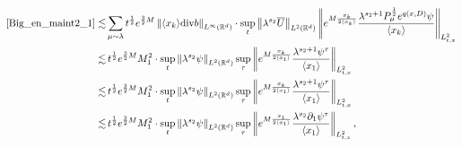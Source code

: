 \documentclass[10pt,twoside,a4paper]{article}
\numberwithin{equation}{section}\allowdisplaybreaks
\begin{document}
\begin{align*}
	\eqref{Big_en_maint2_1}\lesssim &  \sum_{\mu\sim \lambda}  t^{\frac12} e^{\frac 32M}\left\|\langle x_k\rangle \mathrm{div}b  \right\|_{L^{\infty}(\mathbb{R}^d)} \cdot \sup_{t }\left\| \lambda^{s_2}\overline{U}\right\|_{L^{2}(\mathbb{R}^d)}   \left\|e^{M \frac{x_k}{2\langle x_k\rangle} }  \frac{\lambda^{s_2+1}P_\mu^{\frac 12}  e^{q (x,D)} \psi}{\langle x_k\rangle }  \right\|_{L^2_{t,x}} \\
	\lesssim & \,t^{\frac12} e^{\frac 32M} M_1^2 \cdot \sup_{t }\left\| \lambda^{s_2} \psi\right\|_{L^{2}(\mathbb{R}^d)}  \sup_{\tau}   \left\| e^{M \frac{x_k}{2\langle x_1\rangle} }  \frac{\lambda^{s_2+1} \psi^{\tau }}{\langle x_1\rangle } \right\|_{L^2_{t,x}}\\
	\lesssim & \,t^{\frac12} e^{\frac 32M} M_1^2  \cdot \sup_{t }\left\| \lambda^{s_2} \psi\right\|_{L^{2}(\mathbb{R}^d)}  \sup_{\tau}   \left\| e^{M \frac{x_k}{2\langle x_1\rangle} }  \frac{\lambda^{s_2+1} \psi^{\tau }}{\langle x_1\rangle } \right\|_{L^2_{t,x}} \\
	\lesssim & \,t^{\frac12} e^{\frac 32M} M_1^2 \cdot \sup_{t }\left\| \lambda^{s_2} \psi\right\|_{L^{2}(\mathbb{R}^d)}  \sup_{\tau}   \left\| e^{M \frac{x_1}{2\langle x_1\rangle} }  \frac{\lambda^{s_2}  \partial_1\psi^{\tau }}{\langle x_1\rangle } \right\|_{L^2_{t,x}},
\end{align*}
\end{document}
